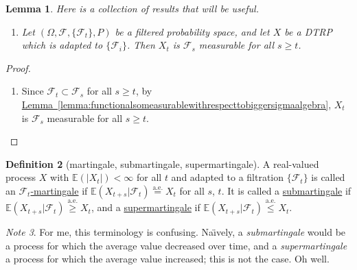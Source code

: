 \documentclass[a4paper,12pt]{scrreprt}
\newcommand{\defn}[1]{\ul{#1}}
\theoremstyle{definition}
\newtheorem{definition}{Definition}
\theoremstyle{plain}
\newtheorem{lemma}[definition]{Lemma}
\theoremstyle{remark}
\newtheorem{note}[definition]{Note}
\begin{document}
\begin{lemma}
  Here is a collection of results that will be useful.
  \begin{enumerate}
    \item Let $(\Omega, \mathcal{F}, \{ \mathcal{F}_{t} \}, P)$ be a filtered probability space, and let $X$ be a DTRP which is adapted to $\{ \mathcal{F}_{i} \}$. Then $X_{t}$ is $\mathcal{F}_{s}$ measurable for all $s \geq t$.
  \end{enumerate}
\end{lemma}
\begin{proof}
  $\,$
  \begin{enumerate}
    \item Since $\mathcal{F}_{t} \subset \mathcal{F}_{s}$ for all $s \geq t$, by \hyperref[lemma:functionalsomeasurablewithrespecttobiggersigmaalgebra]{Lemma~\ref*{lemma:functionalsomeasurablewithrespecttobiggersigmaalgebra}}, $X_{t}$ is $\mathcal{F}_{s}$ measurable for all $s \geq t$.
  \end{enumerate}
\end{proof}

\begin{definition}[martingale, submartingale, supermartingale]
  \label{def:subsupermartingale}
  A real-valued process $X$ with $\mathbb{E}(|X_{t}|) < \infty$ for all $t$ and adapted to a filtration $\{\mathcal{F}_{t}\}$ is called an \defn{$\mathcal{F}_{t}$-martingale} if $\mathbb{E}(X_{t+s}|\mathcal{F}_{t}) \overset{\mathrm{a.e.}}{=} X_{t}$ for all $s$, $t$. It is called a \defn{submartingale} if $\mathbb{E}(X_{t+s}|\mathcal{F}_{t}) \overset{\mathrm{a.e.}}{\geq} X_{t}$, and a \defn{supermartingale} if $\mathbb{E}(X_{t+s}|\mathcal{F}_{t}) \overset{\mathrm{a.e.}}{\leq} X_{t}$.
\end{definition}

\begin{note}
  For me, this terminology is confusing. Na\"{\i}vely, a \emph{submartingale} would be a process for which the average value decreased over time, and a \emph{supermartingale} a process for which the average value increased; this is not the case. Oh well.
\end{note}
\end{document}

